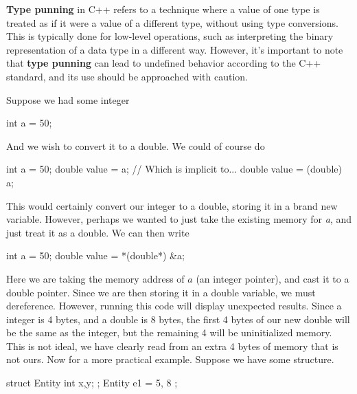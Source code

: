 \documentclass{report}
\begin{document}
    \pagebreak 
    \bigbreak \noindent 
    \begin{concept}
       \textbf{Type punning} in C++ refers to a technique where a value of one type is treated as if it were a value of a different type, without using type conversions. This is typically done for low-level operations, such as interpreting the binary representation of a data type in a different way. However, it's important to note that \textbf{type punning} can lead to undefined behavior according to the C++ standard, and its use should be approached with caution. 
    \end{concept}
    \bigbreak \noindent 
    Suppose we had some integer
    \bigbreak \noindent 
    \begin{cppcode}
    int a = 50;
    \end{cppcode}
    \bigbreak \noindent 
    And we wish to convert it to a double. We could of course do 
    \bigbreak \noindent 
    \begin{cppcode}
    int a = 50;
    double value = a; // Which is implicit to... double value = (double) a;
    \end{cppcode}
    \bigbreak \noindent 
    This would certainly convert our integer to a double, storing it in a brand new variable. However, perhaps we wanted to just take the existing memory for \textit{a}, and just treat it as a double. We can then write
    \bigbreak \noindent 
    \begin{cppcode}
    int a  = 50;
    double value = *(double*) &a;
    \end{cppcode}
    \bigbreak \noindent 
    Here we are taking the memory address of $a$ (an integer pointer), and cast it to a double pointer. Since we are then storing it in a double variable, we must dereference.
    However, running this code will display unexpected results. Since a integer is 4 bytes, and a double is 8 bytes, the first 4 bytes of our new double will be the same as the integer, but the remaining 4
    will be uninitialized memory. This is not ideal, we have clearly read from an extra 4 bytes of memory that is not ours.
    \bigbreak \noindent 
    \bigbreak \noindent 
    Now for a more practical example. Suppose we have some structure.
    \bigbreak \noindent 
    \begin{cppcode}
        struct Entity {
            int x,y;
        };
        Entity e1 = { 5, 8 };
    \end{cppcode}
\end{document}
